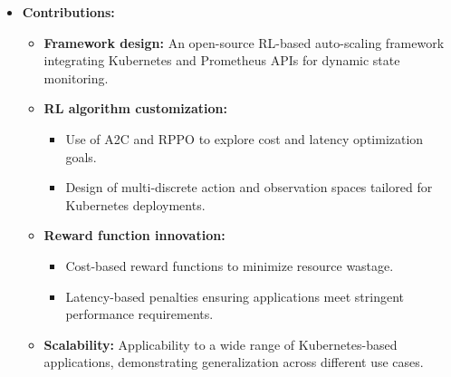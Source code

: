 \documentclass[conference]{IEEEtran}
\begin{document}
\begin{itemize}
    \item \textbf{Contributions:}
    \begin{itemize}
        \item \textbf{Framework design:} An open-source RL-based auto-scaling framework integrating Kubernetes and Prometheus APIs for dynamic state monitoring.
        \item \textbf{RL algorithm customization:}
        \begin{itemize}
            \item Use of A2C and RPPO to explore cost and latency optimization goals.
            \item Design of multi-discrete action and observation spaces tailored for Kubernetes deployments.
        \end{itemize}
        \item \textbf{Reward function innovation:}
        \begin{itemize}
            \item Cost-based reward functions to minimize resource wastage.
            \item Latency-based penalties ensuring applications meet stringent performance requirements.
        \end{itemize}
        \item \textbf{Scalability:} Applicability to a wide range of Kubernetes-based applications, demonstrating generalization across different use cases.
    \end{itemize}


\end{itemize}
\end{document}

